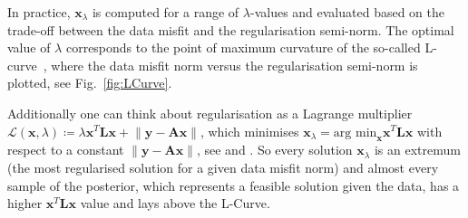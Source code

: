 In practice, $\bm{x}_{\lambda}$ is computed for a range of $\lambda$-values and evaluated based on the trade-off between the data misfit and the regularisation semi-norm. The optimal value of $\lambda$ corresponds to the point of maximum curvature of the so-called L-curve~\cite{hansen1993use}, where the data misfit norm versus the regularisation semi-norm is plotted, see Fig.~\ref{fig:LCurve}.

Additionally one can think about regularisation as a Lagrange multiplier $ \mathcal {L}(\bm{x}, \lambda) \coloneq\lambda \bm{x}^T \bm{L} \bm{x} + \left\lVert \bm{y} - \bm{A} \bm{x} \right\rVert $, which minimises $ \bm{x}_\lambda = \text{arg min}_{\bm{x}} \bm{x}^T \bm{L} \bm{x} $ with respect to a constant $\left\lVert \bm{y} - \bm{A} \bm{x} \right\rVert$, see \cite[fn. 6]{fox2016fast} and \cite[Fig. 2.13]{SANTOSH202265}.
So every solution $\bm{x}_{\lambda}$ is an extremum (the most regularised solution for a given data misfit norm) and almost every sample of the posterior, which represents a feasible solution given the data, has a higher $\bm{x}^T \bm{L} \bm{x}$ value and lays above the L-Curve.


%
%
%
%
%
%
%
%
%
%
%




